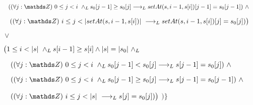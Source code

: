 \documentclass{article}
\begin{document}
\begin{itemize}
    $ \qquad (\paraTodo{j}{0}{i} \yLuego s_0[j-1] \geq s_0[j] \implicaLuego setAt(s,i-1, s[i])[j-1] = s_0[j-1])\ \wedge$

    $ \qquad (\paraTodo{j}{i}{\longitud{setAt(s,i-1, s[i])}} \implicaLuego setAt(s,i-1, s[i])[j] = s_0[j]) \big) $

    $ \quad \vee $
    
    $ \quad \big( 1 \leq i < \longitud{s}\ \yLuego s[i-1] \geq s[i] \wedge \longitud{s} = \longitud{s_0}\ \yLuego$

    $ \qquad (\paraTodo{j}{0}{i} \yLuego s_0[j-1] < s_0[j] \implicaLuego s[j-1] = s_0[j])\ \wedge $

    $ \qquad (\paraTodo{j}{0}{i} \yLuego s_0[j-1] \geq s_0[j] \implicaLuego s[j-1] = s_0[j-1])\ \wedge$

    $ \qquad (\paraTodo{j}{i}{\longitud{s}} \implicaLuego s[j] = s_0[j]) \big)$
    $ \Big) \Big\} $

\end{itemize}
\end{document}
